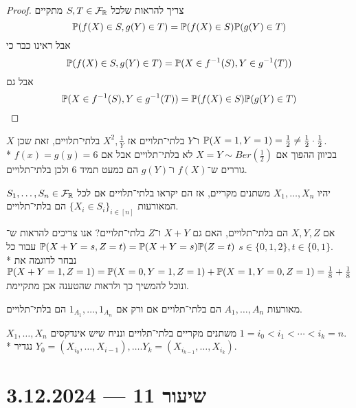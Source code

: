 \begin{proof}
	צריך להראות שלכל $S, T \in \mathcal{F}_{\mathbb{R}}$ מתקיים
	\[
		\mathbb{P}(f(X) \in S, g(Y) \in T) = \mathbb{P}(f(X) \in S) \mathbb{P}(g(Y) \in T)
	\]
	אבל ראינו כבר כי
	\[
		\mathbb{P}(f(X) \in S, g(Y) \in T) = \mathbb{P}(X \in f^{-1}(S), Y \in g^{-1}(T))
	\]
	אבל גם
	\[
		\mathbb{P}(X \in f^{-1}(S), Y \in g^{-1}(T)) = \mathbb{P}(f(X) \in S) \mathbb{P}(g(Y) \in T)
	\]
\end{proof}
\begin{example}
	$X$ ו־$Y$ בלתי־תלויים אז $X^2, \frac{1}{Y}$ בלתי־תלויים, זאת שכן $\mathbb{P}(X = 1, Y = 1) = \frac{1}{2} \ne \frac{1}{2} \cdot \frac{1}{2}$. \\*
	בכיוון ההפוך אם $X = Y \sim Ber(\frac{1}{2})$ לא בלתי־תלויים אבל אם $f(x) = g(y) = 6$ גוררים ש־$f(X)$ ו־$g(Y)$ הם כמעט תמיד 6 ולכן בלתי־תלויים.
\end{example}
\begin{definition}
	יהיו $X_1, \dots, X_n$ משתנים מקריים, אז הם יקראו בלתי־תלויים אם לכל $S_1, \dots, S_n \in \mathcal{F}_{\mathbb{R}}$ המאורעות ${\{ X_i \in S_i \}}_{i \in [n]}$ הם בלתי־תלויים.
\end{definition}
\begin{example}
	אם $X, Y, Z$ הם בלתי־תלויים, האם גם $X + Y$ ו־$Z$ בלתי־תלויים?
	אנו צריכים להראות ש־$\mathbb{P}(X + Y = s, Z = t) = \mathbb{P}(X + Y = s) \mathbb{P}(Z = t)$ עבור כל $s \in \{0, 1, 2\}, t \in \{0, 1\}$. \\*
	נבחר לדוגמה את $\mathbb{P}(X + Y = 1, Z = 1) = \mathbb{P}(X = 0, Y = 1, Z = 1) + \mathbb{P}(X = 1, Y = 0, Z = 1) = \frac{1}{8} + \frac{1}{8}$ ונוכל להמשיך כך ולראות שהטענה אכן מתקיימת.
\end{example}
\begin{exercise}
	מאורעות $A_1, \dots, A_n$ הם בלתי־תלויים אם ורק אם $1_{A_1}, \dots, 1_{A_n}$ הם בלתי־תלויים.
\end{exercise}
\begin{proposition}
	$X_1, \dots, X_n$ משתנים מקריים בלתי־תלויים ונניח שיש אינדקסים $1 = i_0 < i_1 < \cdots < i_k = n$. \\*
	נגדיר $Y_0 = (X_{i_0}, \dots, X_{i - 1}), \dots. Y_k = (X_{i_{k - 1}}, \dots, X_{i_k})$.
\end{proposition}

\section{שיעור 11 --- 3.12.2024}
